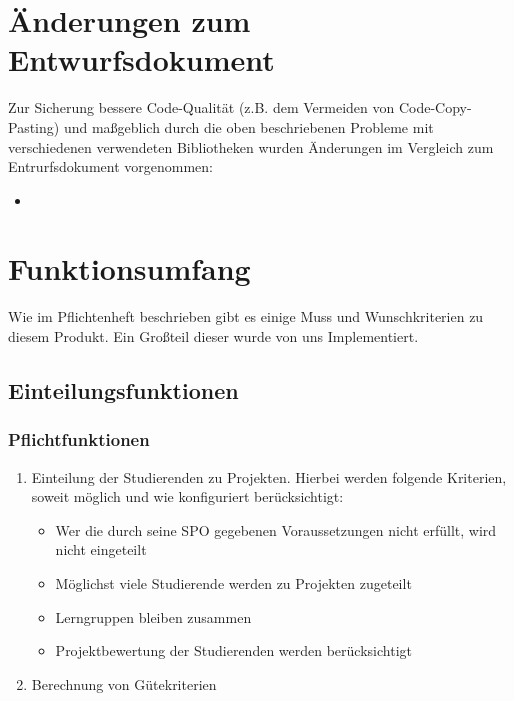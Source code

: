 \documentclass[parskip=full]{scrartcl}
\newcommand{\swtLabel}[1]{\textbf{/#1\arabic*0/}}
\begin{document}
%
\section{Änderungen zum Entwurfsdokument}
Zur Sicherung bessere Code-Qualität (z.B. dem Vermeiden von Code-Copy-Pasting)
und maßgeblich durch die oben beschriebenen Probleme mit verschiedenen
verwendeten Bibliotheken  wurden Änderungen im Vergleich zum  Entrurfsdokument
vorgenommen:
\begin{itemize}
  \item 
\end{itemize}

\section{Funktionsumfang}
Wie im Pflichtenheft beschrieben gibt es einige Muss und Wunschkriterien zu
diesem Produkt. Ein Großteil dieser wurde von uns Implementiert.
\subsection{Einteilungsfunktionen}
\subsubsection{Pflichtfunktionen}
\begin{enumerate}[label=\swtLabel{FA}]
  \item Einteilung der Studierenden zu Projekten. Hierbei werden folgende Kriterien,
soweit möglich und wie konfiguriert berücksichtigt:
\begin{itemize}
  \item Wer die durch seine SPO gegebenen Voraussetzungen nicht erfüllt, wird nicht
eingeteilt
\item Möglichst viele Studierende werden zu Projekten zugeteilt
\item Lerngruppen bleiben zusammen
\item Projektbewertung der Studierenden werden berücksichtigt
\end{itemize}
\item Berechnung von Gütekriterien
\end{enumerate}
\end{document}
